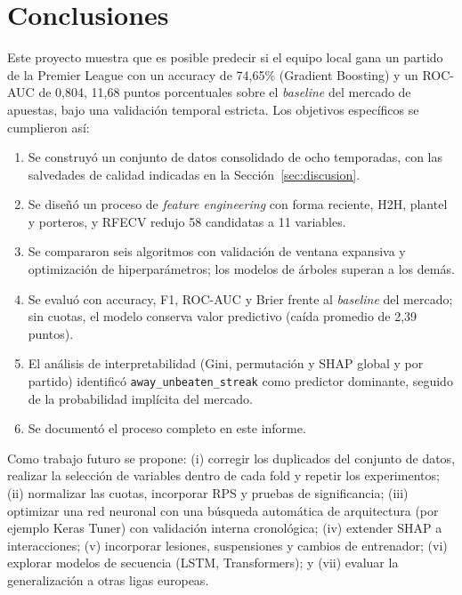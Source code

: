 \documentclass{ieeeaccess}
\begin{document}
\section{Conclusiones}
\label{sec:conclusiones}
Este proyecto muestra que es posible predecir si el equipo local gana un partido de la Premier League con un accuracy de 74,65\% (Gradient Boosting) y un ROC-AUC de 0,804, 11,68 puntos porcentuales sobre el \textit{baseline} del mercado de apuestas, bajo una validación temporal estricta. Los objetivos específicos se cumplieron así:
\begin{enumerate}
\item Se construyó un conjunto de datos consolidado de ocho temporadas, con las salvedades de calidad indicadas en la Sección~\ref{sec:discusion}.
\item Se diseñó un proceso de \textit{feature engineering} con forma reciente, H2H, plantel y porteros, y RFECV redujo 58 candidatas a 11 variables.
\item Se compararon seis algoritmos con validación de ventana expansiva y optimización de hiperparámetros; los modelos de árboles superan a los demás.
\item Se evaluó con accuracy, F1, ROC-AUC y Brier frente al \textit{baseline} del mercado; sin cuotas, el modelo conserva valor predictivo (caída promedio de 2,39 puntos).
\item El análisis de interpretabilidad (Gini, permutación y SHAP global y por partido) identificó \texttt{away\_unbeaten\_streak} como predictor dominante, seguido de la probabilidad implícita del mercado.
\item Se documentó el proceso completo en este informe.
\end{enumerate}

Como trabajo futuro se propone: (i) corregir los duplicados del conjunto de datos, realizar la selección de variables dentro de cada fold y repetir los experimentos; (ii) normalizar las cuotas, incorporar RPS y pruebas de significancia; (iii) optimizar una red neuronal con una búsqueda automática de arquitectura (por ejemplo Keras Tuner) con validación interna cronológica; (iv) extender SHAP a interacciones; (v) incorporar lesiones, suspensiones y cambios de entrenador; (vi) explorar modelos de secuencia (LSTM, Transformers); y (vii) evaluar la generalización a otras ligas europeas.




\EOD
\end{document}

